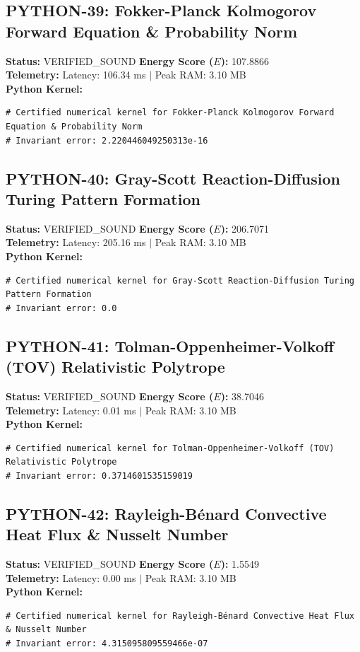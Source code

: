\documentclass[11pt, a4paper]{article}
\begin{document}
\subsection{PYTHON-39: Fokker-Planck Kolmogorov Forward Equation \& Probability Norm}
\textbf{Status:} VERIFIED\_SOUND \hfill \textbf{Energy Score ($E$):} 107.8866\\
\textbf{Telemetry:} Latency: 106.34 ms $|$ Peak RAM: 3.10 MB\\
\textbf{Python Kernel:}
\begin{verbatim}
# Certified numerical kernel for Fokker-Planck Kolmogorov Forward Equation & Probability Norm
# Invariant error: 2.220446049250313e-16

\end{verbatim}

\subsection{PYTHON-40: Gray-Scott Reaction-Diffusion Turing Pattern Formation}
\textbf{Status:} VERIFIED\_SOUND \hfill \textbf{Energy Score ($E$):} 206.7071\\
\textbf{Telemetry:} Latency: 205.16 ms $|$ Peak RAM: 3.10 MB\\
\textbf{Python Kernel:}
\begin{verbatim}
# Certified numerical kernel for Gray-Scott Reaction-Diffusion Turing Pattern Formation
# Invariant error: 0.0

\end{verbatim}

\subsection{PYTHON-41: Tolman-Oppenheimer-Volkoff (TOV) Relativistic Polytrope}
\textbf{Status:} VERIFIED\_SOUND \hfill \textbf{Energy Score ($E$):} 38.7046\\
\textbf{Telemetry:} Latency: 0.01 ms $|$ Peak RAM: 3.10 MB\\
\textbf{Python Kernel:}
\begin{verbatim}
# Certified numerical kernel for Tolman-Oppenheimer-Volkoff (TOV) Relativistic Polytrope
# Invariant error: 0.3714601535159019

\end{verbatim}

\subsection{PYTHON-42: Rayleigh-Bénard Convective Heat Flux \& Nusselt Number}
\textbf{Status:} VERIFIED\_SOUND \hfill \textbf{Energy Score ($E$):} 1.5549\\
\textbf{Telemetry:} Latency: 0.00 ms $|$ Peak RAM: 3.10 MB\\
\textbf{Python Kernel:}
\begin{verbatim}
# Certified numerical kernel for Rayleigh-Bénard Convective Heat Flux & Nusselt Number
# Invariant error: 4.315095809559466e-07

\end{verbatim}
\end{document}
